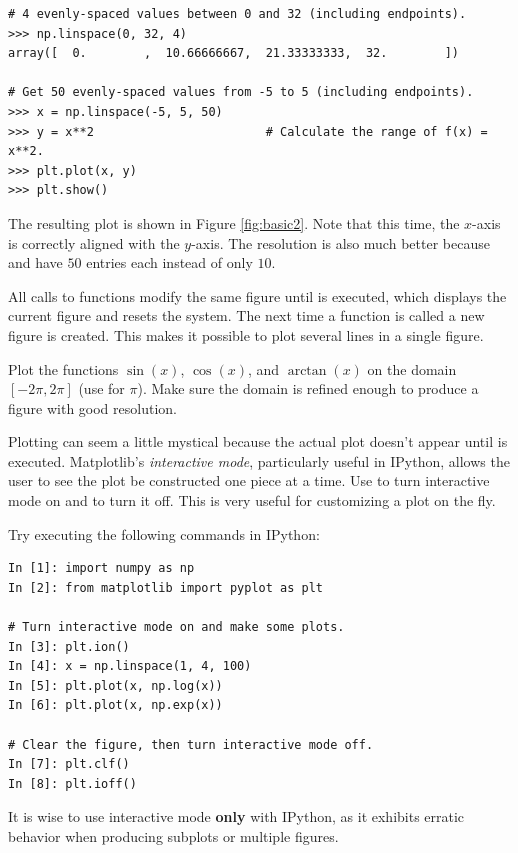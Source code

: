 \begin{lstlisting}
# 4 evenly-spaced values between 0 and 32 (including endpoints).
>>> np.linspace(0, 32, 4)
array([  0.        ,  10.66666667,  21.33333333,  32.        ])

# Get 50 evenly-spaced values from -5 to 5 (including endpoints).
>>> x = np.linspace(-5, 5, 50)
>>> y = x**2                        # Calculate the range of f(x) = x**2.
>>> plt.plot(x, y)
>>> plt.show()
\end{lstlisting}

The resulting plot is shown in Figure \ref{fig:basic2}.
Note that this time, the $x$-axis is correctly aligned with the $y$-axis.
The resolution is also much better because  and  have $50$ entries each instead of only $10$.

All calls to  functions modify the same figure until  is executed, which displays the current figure and resets the system.
The next time a  function is called a new figure is created.
This makes it possible to plot several lines in a single figure.

\begin{problem} %
Plot the functions $\sin(x)$, $\cos(x)$, and $\arctan(x)$ on the domain $[-2\pi, 2\pi]$ (use  for $\pi$).
Make sure the domain is refined enough to produce a figure with good resolution.
\end{problem}

\begin{info} %
Plotting can seem a little mystical because the actual plot doesn't appear until  is executed.
Matplotlib's \emph{interactive mode}, particularly useful in IPython, allows the user to see the plot be constructed one piece at a time.
Use  to turn interactive mode on and  to turn it off.
This is very useful for customizing a plot on the fly.

Try executing the following commands in IPython:

\begin{lstlisting}
In [1]: import numpy as np
In [2]: from matplotlib import pyplot as plt

# Turn interactive mode on and make some plots.
In [3]: plt.ion()
In [4]: x = np.linspace(1, 4, 100)
In [5]: plt.plot(x, np.log(x))
In [6]: plt.plot(x, np.exp(x))

# Clear the figure, then turn interactive mode off.
In [7]: plt.clf()
In [8]: plt.ioff()
\end{lstlisting}

It is wise to use interactive mode \textbf{only} with IPython, as it exhibits erratic behavior when producing subplots or multiple figures.
\end{info}

